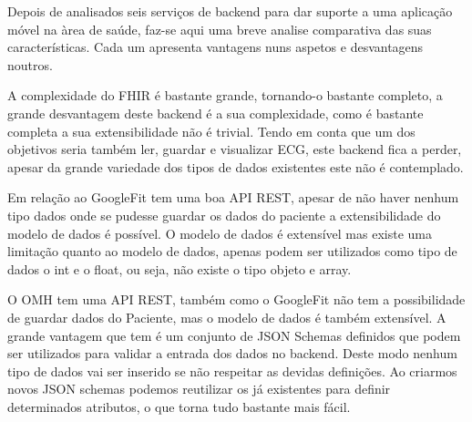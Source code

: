 Depois de analisados seis serviços de backend para dar suporte a uma aplicação móvel na àrea de saúde, faz-se aqui uma breve analise comparativa das suas características. Cada um apresenta vantagens nuns aspetos e desvantagens noutros.
\par 
A complexidade do \gls{FHIR} é bastante grande, tornando-o bastante completo, a grande desvantagem deste backend é a sua complexidade, como é bastante completa a sua extensibilidade não é trivial. Tendo em conta que um dos objetivos seria também ler, guardar e visualizar \gls{ECG}, este backend fica a perder, apesar da grande variedade dos tipos de dados existentes este não é contemplado.
\par 
Em relação ao GoogleFit tem uma boa \gls{API} \gls{REST}, apesar de não haver nenhum tipo dados onde se pudesse guardar os dados do paciente a extensibilidade do modelo de dados é possível. O modelo de dados é extensível mas existe uma limitação quanto ao modelo de dados, apenas podem ser utilizados como tipo de dados o int e o float, ou seja, não existe o tipo objeto e array.
\par 
O \gls{OMH} tem uma \gls{API} \gls{REST}, também como o GoogleFit não tem a possibilidade de guardar dados do Paciente, mas o modelo de dados é também extensível. A grande vantagem que tem é um conjunto de \gls{JSON} Schemas definidos que podem ser utilizados para validar a entrada dos dados no backend. Deste modo nenhum tipo de dados vai ser inserido se não respeitar as devidas definições. Ao criarmos novos \gls{JSON} schemas podemos reutilizar os já existentes para definir determinados atributos, o que torna tudo bastante mais fácil.

\cleardoublepage